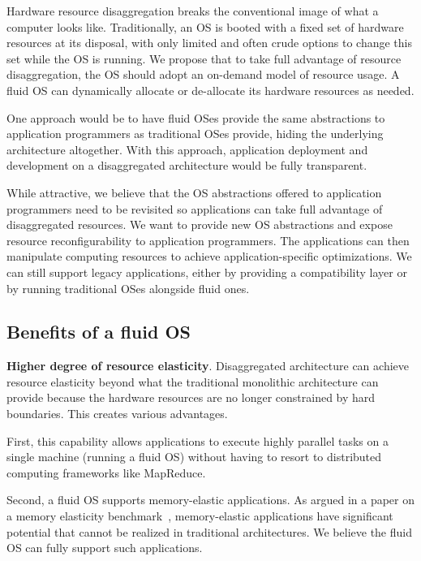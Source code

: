 Hardware resource disaggregation breaks the conventional image of
what a computer looks like.  Traditionally, an OS is booted with a
fixed set of hardware resources at its disposal, with only limited
and often crude options to change this set while the OS is running.
We propose that to take full advantage of resource disaggregation,
the OS should adopt an on-demand model of resource usage. A
fluid OS can dynamically allocate or de-allocate its hardware
resources as needed.

One approach would be to have fluid OSes provide the
same abstractions to application programmers as traditional
OSes provide, hiding the underlying architecture altogether.
With this approach, application deployment and development
on a disaggregated architecture would be fully transparent.

While attractive, we believe that the OS abstractions offered to
application programmers need to be revisited so applications
can take full advantage of disaggregated resources.
We want to provide new OS abstractions and expose
resource reconfigurability to application programmers.
The applications can then manipulate computing resources to
achieve application-specific optimizations.
We can still support legacy applications, either by providing
a compatibility layer or by running traditional OSes alongside
fluid ones.

\subsection{Benefits of a fluid OS}
\label{sec:benefits}
\noindent
\textbf{Higher degree of resource elasticity}.
Disaggregated architecture can achieve resource elasticity beyond
what the traditional monolithic architecture can provide because
the hardware resources are no longer constrained by hard boundaries.
This creates various advantages.

First, this capability allows applications to execute highly parallel
tasks on a single machine (running a fluid OS) without
having to resort to distributed computing frameworks like MapReduce.

Second, a fluid OS supports memory-elastic applications.
As argued in a paper on a memory elasticity
benchmark~\cite{funaro2020memory}, memory-elastic applications have
significant potential that cannot be realized in traditional
architectures.  We believe the fluid OS can fully support
such applications.

